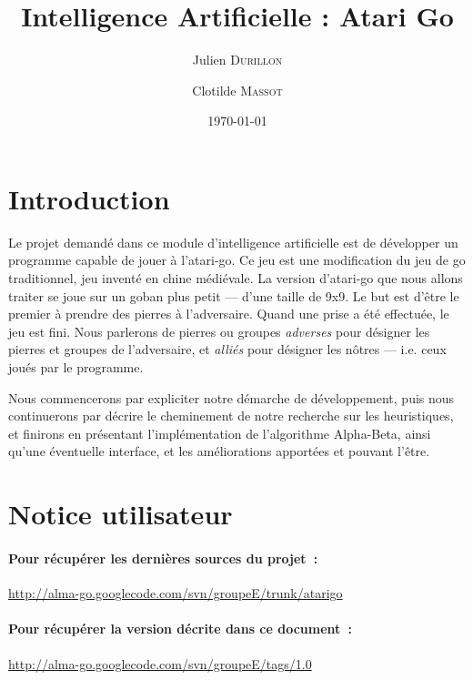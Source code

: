 \documentclass[11pt,a4paper,titlepage,french]{article}
\title{Intelligence Artificielle : Atari Go}
\author{Julien \textsc{Durillon} \and Clotilde \textsc{Massot}}
\date{\today}
\begin{document}
	

	\tableofcontents
	\clearpage

	\listoffigures
	\clearpage


	\section*{Introduction}
		Le projet demandé dans ce module d'intelligence artificielle est de développer un programme capable de jouer à l'atari-go. Ce jeu est une modification du jeu de go traditionnel, jeu inventé en chine médiévale. La version d'atari-go que nous allons traiter se joue sur un goban plus petit --- d'une taille de 9x9. Le but est d'être le premier à prendre des pierres à l'adversaire. Quand une prise a été effectuée, le jeu est fini. Nous parlerons de pierres ou groupes \emph{adverses} pour désigner les pierres et groupes de l'adversaire, et \emph{alliés} pour désigner les nôtres --- i.e. ceux joués par le programme.

		Nous commencerons par expliciter notre démarche de développement, puis nous continuerons par décrire le cheminement de notre recherche sur les heuristiques, et finirons en présentant l'implémentation de l'algorithme Alpha-Beta, ainsi qu'une éventuelle interface, et les améliorations apportées et pouvant l'être.

	\section*{Notice utilisateur}

		\paragraph{Pour récupérer les dernières sources du projet~:} \url{http://alma-go.googlecode.com/svn/groupeE/trunk/atarigo}

		\paragraph{Pour récupérer la version décrite dans ce document~:} \url{http://alma-go.googlecode.com/svn/groupeE/tags/1.0}
\end{document}

